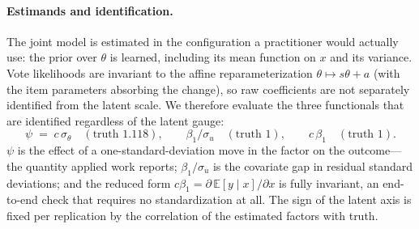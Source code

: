 \paragraph{Estimands and identification.}
The joint model is estimated in the configuration a practitioner would
actually use: the prior over $\theta$ is learned, including its mean
function on $x$ and its variance.  Vote likelihoods are invariant to the
affine reparameterization $\theta\mapsto s\theta+a$ (with the item
parameters absorbing the change), so raw coefficients are not separately
identified from the latent scale.  We therefore evaluate the three
functionals that are identified regardless of the latent gauge:
\begin{equation}
  \psi \;=\; c\,\sigma_\theta
  \quad(\text{truth }1.118), \qquad
  \beta_1/\sigma_u \quad(\text{truth }1), \qquad
  c\,\beta_1 \quad(\text{truth }1).
  \label{eq:sim-functionals}
\end{equation}
$\psi$ is the effect of a one-standard-deviation move in the factor on the
outcome---the quantity applied work reports; $\beta_1/\sigma_u$ is the
covariate gap in residual standard deviations; and the reduced form
$c\beta_1=\partial\,\mathbb{E}[y\mid x]/\partial x$ is fully invariant, an
end-to-end check that requires no standardization at all.  The sign of the
latent axis is fixed per replication by the correlation of the estimated
factors with truth.

